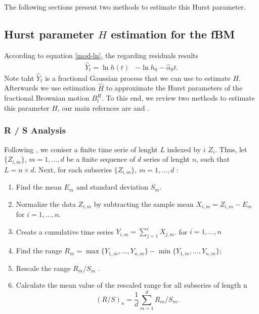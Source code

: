 \documentclass[smallextended]{svjour3}
\begin{document}
        The following sections present two methods to estimate this Hurst 
    parameter.

    \subsection{Hurst parameter $H$ estimation for the fBM}
    \label{Desc-Est-H}

        According to equation \eqref{mod-ln}, the regarding residuals results 
    \begin{align*}
        \hat Y_t= \ln h(t) &
            -\ln h_0 -\widehat \alpha_0 t.
    \end{align*}
    Note taht $\hat Y_t$ is a fractional Gaussian process that we can use 
    to estimate $H$. Afterwards we use estimation $\hat H$ to approximate
    the Hurst parameters of the fractional Brownian motion $B_t^H$.
    To this end, we review two methods to estimate
    this parameter $H$, our main refernces are \citet{we} and \citet{ra}.
    
    \subsubsection{R / S Analysis}
    Following \citet{we}, we coniser a finite time serie of lenght $L$ indexed
    by $i$ $Z_i$. Thus, let $\{Z_{i,m}\}$, $m = 1,\ldots,d$ be a finite 
    sequence of $d$ series of lenght $n$, such that $L = n \times d$.
    Next, for each subseries  
    $\{Z_{i,m}\}$, $m = 1,\ldots,d$ :
    \begin{enumerate}
        \item 
            Find the mean $E_m$ and standard deviation $S_m$.
        \item 
            Normalize the data $Z_{i,m}$  by subtracting the sample mean 
            $X_{i,m} = Z_{i,m}-E_m$ for $i=1,\ldots,n$.
        \item 
            Create a cumulative time series $Y_{i,m} = \sum_{j=1}^i X_{j,m}$.
            for $i = 1,\ldots,n$
        \item 
            Find the range 
            $   
                R_m = \max\{Y_{1,m},\ldots, Y_{n,m}\} -
                \min\{Y_{1,m},\ldots, Y_{n,m} \}
            $;
        \item 
            Rescale the range $R_m/S_m$ .
        \item 
            Calculate the mean value of the rescaled range
            for all subseries of length n
            \[
                (R/S)_n =\frac{1}{d}\sum_{m=1}^d  R_m /S_m.
            \]
    \end{enumerate}
\end{document}
